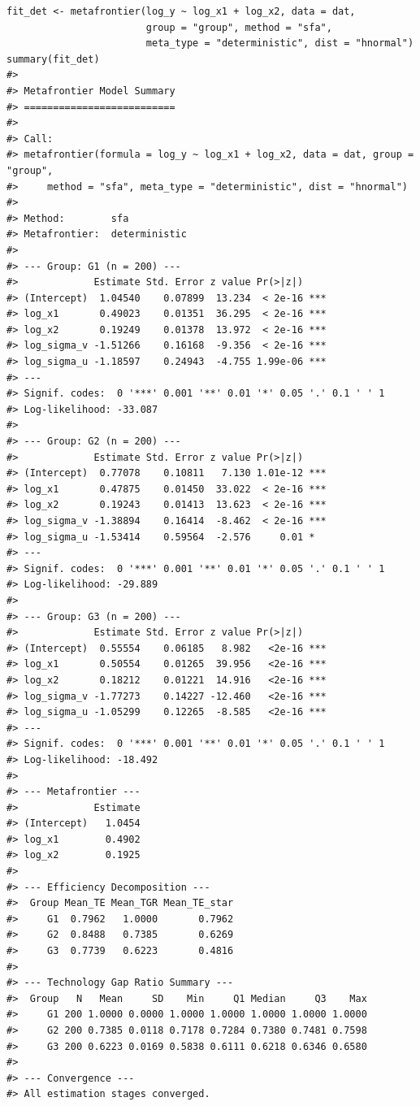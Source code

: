\begin{verbatim}
fit_det <- metafrontier(log_y ~ log_x1 + log_x2, data = dat,
                        group = "group", method = "sfa",
                        meta_type = "deterministic", dist = "hnormal")
summary(fit_det)
#> 
#> Metafrontier Model Summary
#> ==========================
#> 
#> Call:
#> metafrontier(formula = log_y ~ log_x1 + log_x2, data = dat, group = "group", 
#>     method = "sfa", meta_type = "deterministic", dist = "hnormal")
#> 
#> Method:        sfa 
#> Metafrontier:  deterministic 
#> 
#> --- Group: G1 (n = 200) ---
#>             Estimate Std. Error z value Pr(>|z|)    
#> (Intercept)  1.04540    0.07899  13.234  < 2e-16 ***
#> log_x1       0.49023    0.01351  36.295  < 2e-16 ***
#> log_x2       0.19249    0.01378  13.972  < 2e-16 ***
#> log_sigma_v -1.51266    0.16168  -9.356  < 2e-16 ***
#> log_sigma_u -1.18597    0.24943  -4.755 1.99e-06 ***
#> ---
#> Signif. codes:  0 '***' 0.001 '**' 0.01 '*' 0.05 '.' 0.1 ' ' 1
#> Log-likelihood: -33.087 
#> 
#> --- Group: G2 (n = 200) ---
#>             Estimate Std. Error z value Pr(>|z|)    
#> (Intercept)  0.77078    0.10811   7.130 1.01e-12 ***
#> log_x1       0.47875    0.01450  33.022  < 2e-16 ***
#> log_x2       0.19243    0.01413  13.623  < 2e-16 ***
#> log_sigma_v -1.38894    0.16414  -8.462  < 2e-16 ***
#> log_sigma_u -1.53414    0.59564  -2.576     0.01 *  
#> ---
#> Signif. codes:  0 '***' 0.001 '**' 0.01 '*' 0.05 '.' 0.1 ' ' 1
#> Log-likelihood: -29.889 
#> 
#> --- Group: G3 (n = 200) ---
#>             Estimate Std. Error z value Pr(>|z|)    
#> (Intercept)  0.55554    0.06185   8.982   <2e-16 ***
#> log_x1       0.50554    0.01265  39.956   <2e-16 ***
#> log_x2       0.18212    0.01221  14.916   <2e-16 ***
#> log_sigma_v -1.77273    0.14227 -12.460   <2e-16 ***
#> log_sigma_u -1.05299    0.12265  -8.585   <2e-16 ***
#> ---
#> Signif. codes:  0 '***' 0.001 '**' 0.01 '*' 0.05 '.' 0.1 ' ' 1
#> Log-likelihood: -18.492 
#> 
#> --- Metafrontier ---
#>             Estimate
#> (Intercept)   1.0454
#> log_x1        0.4902
#> log_x2        0.1925
#> 
#> --- Efficiency Decomposition ---
#>  Group Mean_TE Mean_TGR Mean_TE_star
#>     G1  0.7962   1.0000       0.7962
#>     G2  0.8488   0.7385       0.6269
#>     G3  0.7739   0.6223       0.4816
#> 
#> --- Technology Gap Ratio Summary ---
#>  Group   N   Mean     SD    Min     Q1 Median     Q3    Max
#>     G1 200 1.0000 0.0000 1.0000 1.0000 1.0000 1.0000 1.0000
#>     G2 200 0.7385 0.0118 0.7178 0.7284 0.7380 0.7481 0.7598
#>     G3 200 0.6223 0.0169 0.5838 0.6111 0.6218 0.6346 0.6580
#> 
#> --- Convergence ---
#> All estimation stages converged.
\end{verbatim}

